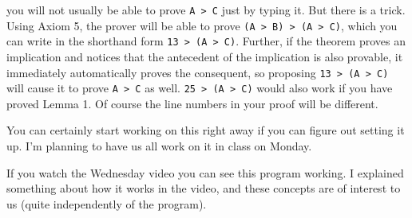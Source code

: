 \documentclass[12pt]{article}
\begin{document}
you will not usually be able to prove {\tt A > C} just by typing it.  But there is a trick.  Using Axiom 5, the prover will be able to prove
{\tt (A > B) > (A > C)}, which you can write in the shorthand form {\tt *13 > (A > C)}.  Further, if the theorem proves an implication and notices that the antecedent of the implication
is also provable, it immediately automatically proves the consequent, so proposing {\tt *13 > (A > C)} will cause it to prove {\tt A > C} as well.  {\tt *25 > (A > C)}  would also work if
you have proved Lemma 1.  Of course the line numbers in your proof will be different.

You can certainly start working on this right away if you can figure out setting it up.  I'm planning to have us all work on it in class on Monday.

If you watch the Wednesday video you can see this program working.  I explained something about how it works in the video, and these concepts are of interest to us (quite independently of the program).
\end{document}
